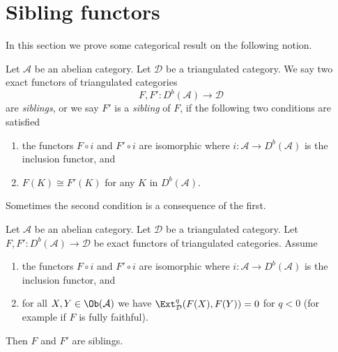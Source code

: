 \section{Sibling functors}
\label{section-sibling}

\noindent
In this section we prove some categorical result on the following notion.

\begin{definition}
\label{definition-siblings}
Let $\mathcal{A}$ be an abelian category. Let $\mathcal{D}$ be a
triangulated category. We say two exact functors of triangulated categories
$$
F, F' : D^b(\mathcal{A}) \longrightarrow \mathcal{D}
$$
are {\it siblings}, or we say $F'$ is a {\it sibling} of $F$,
if the following two conditions are satisfied
\begin{enumerate}
\item the functors $F \circ i$ and $F' \circ i$ are isomorphic
where $i : \mathcal{A} \to D^b(\mathcal{A})$ is the inclusion functor, and
\item $F(K) \cong F'(K)$ for any $K$ in $D^b(\mathcal{A})$.
\end{enumerate}
\end{definition}

\noindent
Sometimes the second condition is a consequence of the first.

\begin{lemma}
\label{lemma-sibling-fully-faithful}
Let $\mathcal{A}$ be an abelian category. Let $\mathcal{D}$ be a
triangulated category. Let
$F, F' : D^b(\mathcal{A}) \longrightarrow \mathcal{D}$
be exact functors of triangulated categories. Assume
\begin{enumerate}
\item the functors $F \circ i$ and $F' \circ i$ are isomorphic
where $i : \mathcal{A} \to D^b(\mathcal{A})$ is the inclusion functor, and
\item for all $X, Y \in \Ob(\mathcal{A})$ we have
$\Ext^q_\mathcal{D}(F(X), F(Y)) = 0$ for $q < 0$ (for example
if $F$ is fully faithful).
\end{enumerate}
Then $F$ and $F'$ are siblings.
\end{lemma}

